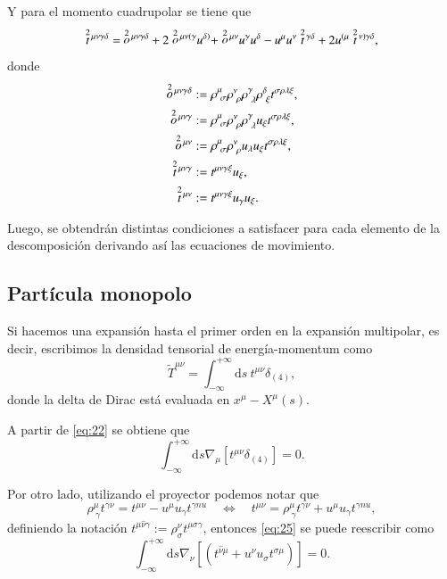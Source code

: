 Y para el momento cuadrupolar se tiene que
\begin{equation}
\des{2}{t}^{\mu \nu \gamma \delta} = \ \des{2}{o}^{\mu \nu \gamma \delta} + 2 \des{2}{o}^{\mu \nu (\gamma} u^{\delta)} + \des{2}{o}^{\mu \nu} u^{\gamma} u^{\delta} - u^{\mu} u^{\nu} \des{2}{t}^{\gamma \delta} + 2 u^{(\mu} \des{2}{t}^{\nu) \gamma \delta},
\end{equation}
donde
\begin{align*}
\des{2}{o}^{\mu \nu \gamma \delta} &:= \rho^{\mu}_{\ \sigma} \rho^{\nu}_{\ \rho} \rho^{\gamma}_{\ \lambda} \rho^{\delta}_{\ \xi} t^{\sigma \rho \lambda \xi},\\
\des{2}{o}^{\mu \nu \gamma} &:= \rho^{\mu}_{\ \sigma} \rho^{\nu}_{\ \rho} \rho^{\gamma}_{\ \lambda} u_{\xi} t^{\sigma \rho \lambda \xi},\\
\des{2}{o}^{\mu \nu} &:= \rho^{\mu}_{\ \sigma} \rho^{\nu}_{\ \rho} u_{\lambda} u_{\xi} t^{\sigma \rho \lambda \xi},\\
\des{2}{t}^{\mu \nu \gamma} &:= t^{\mu \nu \gamma \xi} u_{\xi},\\
 \des{2}{t}^{\mu \nu} &:= t^{\mu \nu \gamma \xi} u_{\gamma} u_{\xi}.
\end{align*}

Luego, se obtendrán distintas condiciones a satisfacer para cada elemento de la descomposición derivando así las ecuaciones de movimiento.

\subsection{Partícula monopolo}

Si hacemos una expansión hasta el primer orden en la expansión multipolar, es decir, escribimos la densidad tensorial de energía-momentum como
\begin{equation}
\tilde{T}^{\mu \nu} = \int_{-\infty}^{+\infty} \mathrm{d}s \ t^{\mu \nu} \delta_{(4)},
\end{equation}
donde la delta de Dirac está evaluada en $x^{\mu} - X^{\mu}(s)$.

A partir de \eqref{eq:22} se obtiene que
\begin{equation}
\label{eq:25}
\int_{-\infty}^{+\infty} \mathrm{d}s \nabla_{\mu} [ t^{\mu \nu} \delta_{(4)}] = 0.
\end{equation}

Por otro lado, utilizando el proyector podemos notar que
\begin{equation}
\rho^{\mu}_{\ \gamma} t^{\gamma \nu} = t^{\mu \nu} - u^{\mu} u_{\gamma} t^{\gamma nu}
\quad \Longleftrightarrow \quad t^{\mu \nu} = \rho^{\mu}_{\ \gamma} t^{\gamma \nu} + u^{\mu} u_{\gamma} t^{\gamma nu},
\end{equation}
definiendo la notación $t^{\mu \hat{\nu} \gamma} := \rho^{\nu}_{\sigma} t^{\mu \sigma \gamma} $, entonces  \eqref{eq:25} se puede reescribir como
\begin{equation}
\label{eq:26}
\int_{-\infty}^{+\infty} \mathrm{d}s \nabla_{\nu} [(t^{\hat{\nu} \mu} + u^{\nu} u_{\sigma} t^{\sigma \mu} )] = 0.
\end{equation}

